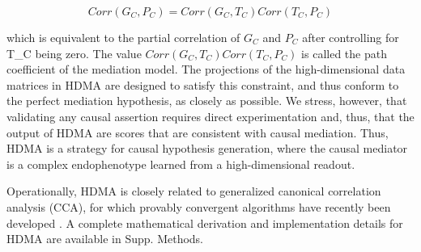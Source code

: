 \documentclass[
]{article}
\begin{document}
\begin{equation*}
Corr(G_C,P_C) = Corr(G_C,T_C)Corr(T_C,P_C)
\end{equation*}

which is equivalent to the partial correlation of \(G_C\) and \(P_C\)
after controlling for T\_C being zero. The value
\(Corr(G_C,T_C)Corr(T_C,P_C)\) is called the path coefficient of the
mediation model. The projections of the high-dimensional data matrices
in HDMA are designed to satisfy this constraint, and thus conform to the
perfect mediation hypothesis, as closely as possible. We stress,
however, that validating any causal assertion requires direct
experimentation and, thus, that the output of HDMA are scores that are
consistent with causal mediation. Thus, HDMA is a strategy for causal
hypothesis generation, where the causal mediator is a complex
endophenotype learned from a high-dimensional readout.

Operationally, HDMA is closely related to generalized canonical
correlation analysis (CCA), for which provably convergent algorithms
have recently been developed \cite{rgcca}. A complete mathematical
derivation and implementation details for HDMA are available in Supp.
Methods.
\end{document}
